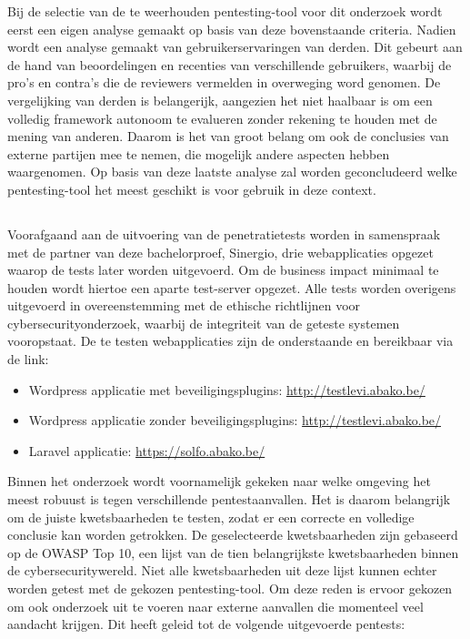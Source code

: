 Bij de selectie van de te weerhouden pentesting-tool voor dit onderzoek wordt eerst een eigen analyse gemaakt op basis van deze bovenstaande criteria. 
Nadien wordt een analyse gemaakt van gebruikerservaringen van derden. Dit gebeurt aan de hand van beoordelingen en recenties van 
verschillende gebruikers, waarbij de pro's en contra's die de reviewers vermelden in overweging word genomen. De vergelijking 
van derden is belangerijk, aangezien het niet haalbaar is om een volledig framework 
autonoom te evalueren zonder rekening te houden met de mening van anderen. Daarom is het van groot belang om ook de conclusies van externe partijen mee te nemen, die mogelijk andere 
aspecten hebben waargenomen. Op basis van 
deze laatste analyse zal worden geconcludeerd welke pentesting-tool het meest geschikt is voor gebruik in deze context.

\subsection{}
Voorafgaand aan de uitvoering van de penetratietests worden in samenspraak met de partner van deze bachelorproef, Sinergio, drie 
webapplicaties opgezet waarop de tests later worden uitgevoerd. Om de business impact minimaal te houden wordt hiertoe een 
aparte test-server opgezet. Alle tests worden overigens uitgevoerd in overeenstemming met de ethische 
richtlijnen voor cybersecurityonderzoek, waarbij de integriteit van de geteste systemen vooropstaat. De te testen 
webapplicaties zijn de onderstaande en bereikbaar via de link:

\begin{itemize}
    \item Wordpress applicatie met beveiligingsplugins: \url{http://testlevi.abako.be/}
    \item Wordpress applicatie zonder beveiligingsplugins: \url{http://testlevi.abako.be/}
    \item Laravel applicatie: \url{https://solfo.abako.be/}
\end{itemize}

Binnen het onderzoek wordt voornamelijk gekeken naar welke omgeving het meest robuust is tegen verschillende pentestaanvallen. 
Het is daarom belangrijk om de juiste kwetsbaarheden te testen, zodat er een correcte en volledige conclusie kan worden 
getrokken. De geselecteerde kwetsbaarheden zijn gebaseerd op de OWASP Top 10, een lijst van de tien belangrijkste 
kwetsbaarheden binnen de cybersecuritywereld. Niet alle kwetsbaarheden uit deze lijst kunnen echter worden getest met de 
gekozen pentesting-tool. Om deze reden is ervoor gekozen om ook onderzoek uit te voeren naar externe aanvallen die momenteel veel 
aandacht krijgen. Dit heeft geleid tot de volgende uitgevoerde pentests:

